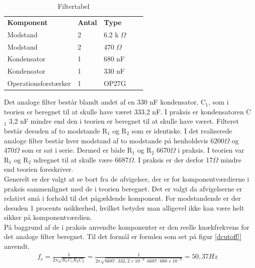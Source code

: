 \begin{table}[H]
\centering
\begin{tabular}{|l|l|l|ll}
\cline{1-3}
\textbf{Komponent} & \textbf{Antal} & \textbf{Type}  &  &  \\ \cline{1-3}
Modstand           & 2              & 6.2 k $\Omega$ &  &  \\ \cline{1-3}
Modstand           & 2              & 470 $\Omega$   &  &  \\ \cline{1-3}
Kondensator        & 1              & 680 nF         &  &  \\ \cline{1-3}
Kondensator        & 1              & 330 nF         &  &  \\ \cline{1-3}
Operationsforstærker &    1         & OP27G          &  &  \\ \cline{1-3}
\end{tabular}
\caption{Filtertabel}
\label{DFiltertabel}
\end{table}

Det analoge filter består blandt andet af en 330 nF kondensator, C$_1$, som i teorien er beregnet til at skulle have været 333,2 nF. I praksis er kondensatoren C$_1$ 3,2 nF mindre end den i teorien er beregnet til at skulle have været. Filteret består desuden af to modstande R$_1$ og R$_2$ som er identiske. I det realiserede analoge filter består hver modstand af to modstande på henholdsvis 6200$\Omega$ og 470$\Omega$ som er sat i serie. Dermed er både R$_1$ og R$_2$ 6670$\Omega$ i praksis. I teorien var R$_1$ og R$_2$ udregnet til at skulle være 6687$\Omega$. I praksis er der derfor 17$\Omega$ mindre end teorien foreskriver.\\

Generelt er der valgt at se bort fra de afvigelser, der er for komponentværdierne i praksis sammenlignet med de i teorien beregnet. Det er valgt da afvigelserne er relativt små i forhold til det pågældende komponent. For modstandende er der desuden 1 procents usikkerhed, hvilket betyder man alligevel ikke kan være helt sikker på komponentværdien.\\

På baggrund af de i praksis anvendte komponenter er den reelle knækfrekvens for det analoge filter beregnet. Til det formål er formlen som set på figur \ref{dcutoff]} anvendt.\\

\begin{align}
f_{c} = \frac{1}{2\pi \sqrt{R_{1}C_{1}R_{2}C_{2}}} = \frac{1}{2\pi \sqrt{6687 \cdot 333,2\times 10^{-9} \cdot 6687 \cdot 680\times 10^{-9}}} = 50,37 Hz
	\label{dcutoff}
\end{align}

